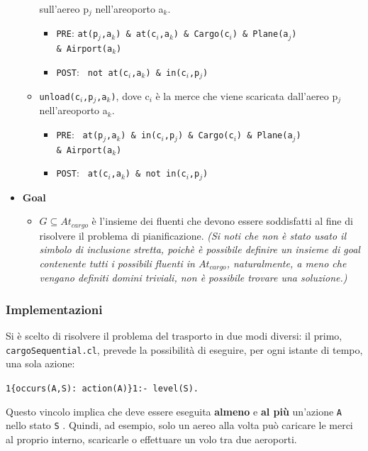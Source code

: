 \documentclass[a4paper,oneside,12pt]{book}
\begin{document}
\begin{itemize}
\begin{itemize}
			sull'aereo p$_{j}$ nell'areoporto a$_{k}$.
			\begin{itemize}
				\item \texttt{PRE}:
				\texttt{at(p$_j$,a$_k$) \& at(c$_i$,a$_k$) \& Cargo(c$_i$) \& Plane(a$_j$)\\ \& Airport(a$_k$)}
				\item \texttt{POST}: \texttt{ not at(c$_i$,a$_k$) \& in(c$_i$,p$_j$)}
			\end{itemize}
			\item \texttt{unload(c$_i$,p$_{j}$,a$_{k}$)}, dove c$_i$ è la merce che viene scaricata
			dall'aereo p$_{j}$ nell'areoporto a$_{k}$.
			\begin{itemize}
				\item \texttt{PRE}:
				\texttt{ at(p$_j$,a$_k$) \& in(c$_i$,p$_j$) \& Cargo(c$_i$) \& Plane(a$_j$)\\ \& Airport(a$_k$)}
				\item \texttt{POST}: \texttt{ at(c$_i$,a$_k$) \& not in(c$_i$,p$_j$)}
			\end{itemize}
		\end{itemize}
		\item \textbf{Goal}
		\begin{itemize}
			\item $G \subseteq At_{cargo}$ è l'insieme dei fluenti che devono essere soddisfatti al fine
			di risolvere il problema di pianificazione. \textit{(Si noti che non è stato usato il simbolo di
			inclusione stretta, poichè è possibile definire un insieme di goal contenente tutti i possibili
			fluenti in $At_{cargo}$, naturalmente, a meno che vengano definiti domini triviali,
			non è possibile trovare una soluzione.)}
		\end{itemize}
	\end{itemize}

	\subsubsection*{Implementazioni}
	Si è scelto di risolvere il problema del trasporto in due modi diversi: il primo, \texttt{cargoSequential.cl},
	prevede la possibilità di eseguire, per ogni istante di tempo, una sola azione:
	\begin{center}
		\texttt{1\{occurs(A,S): action(A)\}1:- level(S).}
	\end{center}
	Questo vincolo implica che deve essere eseguita \textbf{almeno} e \textbf{al più} un'azione
	\texttt{A} nello stato \texttt{S} .
	Quindi, ad esempio, solo un aereo alla volta può caricare le merci al proprio interno,
	scaricarle o effettuare un volo tra due aeroporti.
\end{document}
